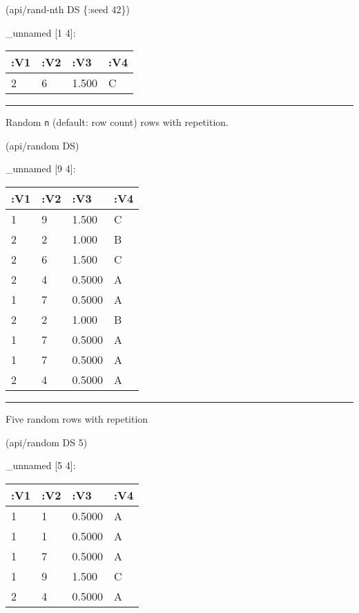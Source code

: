 \documentclass[]{article}
\newenvironment{Shaded}{\begin{snugshade}}{\end{snugshade}}
\newcommand{\DecValTok}[1]{\textcolor[rgb]{0.00,0.00,0.81}{#1}}
\newcommand{\AttributeTok}[1]{\textcolor[rgb]{0.77,0.63,0.00}{#1}}
\newcommand{\NormalTok}[1]{#1}
\begin{document}
\begin{Shaded}
\begin{Highlighting}[]
\NormalTok{(api/rand-nth DS \{}\AttributeTok{:seed} \DecValTok{42}\NormalTok{\})}
\end{Highlighting}
\end{Shaded}

\_unnamed {[}1 4{]}:

\begin{longtable}[]{@{}llll@{}}
\toprule
:V1 & :V2 & :V3 & :V4\tabularnewline
\midrule
\endhead
2 & 6 & 1.500 & C\tabularnewline
\bottomrule
\end{longtable}

\begin{center}\rule{0.5\linewidth}{0.5pt}\end{center}

Random \texttt{n} (default: row count) rows with repetition.

\begin{Shaded}
\begin{Highlighting}[]
\NormalTok{(api/random DS)}
\end{Highlighting}
\end{Shaded}

\_unnamed {[}9 4{]}:

\begin{longtable}[]{@{}llll@{}}
\toprule
:V1 & :V2 & :V3 & :V4\tabularnewline
\midrule
\endhead
1 & 9 & 1.500 & C\tabularnewline
2 & 2 & 1.000 & B\tabularnewline
2 & 6 & 1.500 & C\tabularnewline
2 & 4 & 0.5000 & A\tabularnewline
1 & 7 & 0.5000 & A\tabularnewline
2 & 2 & 1.000 & B\tabularnewline
1 & 7 & 0.5000 & A\tabularnewline
1 & 7 & 0.5000 & A\tabularnewline
2 & 4 & 0.5000 & A\tabularnewline
\bottomrule
\end{longtable}

\begin{center}\rule{0.5\linewidth}{0.5pt}\end{center}

Five random rows with repetition

\begin{Shaded}
\begin{Highlighting}[]
\NormalTok{(api/random DS }\DecValTok{5}\NormalTok{)}
\end{Highlighting}
\end{Shaded}

\_unnamed {[}5 4{]}:

\begin{longtable}[]{@{}llll@{}}
\toprule
:V1 & :V2 & :V3 & :V4\tabularnewline
\midrule
\endhead
1 & 1 & 0.5000 & A\tabularnewline
1 & 1 & 0.5000 & A\tabularnewline
1 & 7 & 0.5000 & A\tabularnewline
1 & 9 & 1.500 & C\tabularnewline
2 & 4 & 0.5000 & A\tabularnewline
\bottomrule
\end{longtable}
\end{document}
